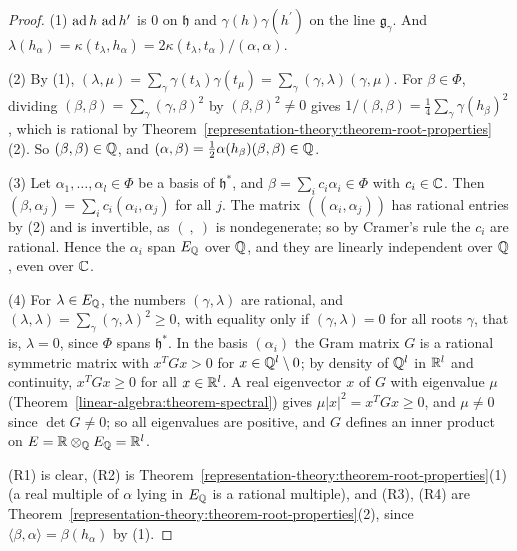 \begin{proof}
(1) $\operatorname{ad} h\,\operatorname{ad} h^{\prime}$ is $0$ on $\mathfrak{h}$ and $\gamma(h)\gamma(h^{\prime})$ on the line $\mathfrak{g}_\gamma$. And
$\lambda(h_\alpha) = \kappa(t_\lambda, h_\alpha) = 2\kappa(t_\lambda, t_\alpha)/(\alpha, \alpha)$.

(2) By (1), $(\lambda, \mu) = \sum_\gamma\gamma(t_\lambda)\gamma(t_\mu) = \sum_\gamma(\gamma, \lambda)(\gamma, \mu)$. For $\beta \in \Phi$, dividing
$(\beta, \beta) = \sum_\gamma(\gamma, \beta)^2$ by $(\beta, \beta)^2 \neq 0$ gives $1/(\beta, \beta) = \frac14\sum_\gamma\gamma(h_\beta)^2$, which is rational by
Theorem~\ref{representation-theory:theorem-root-properties}(2). So $(\beta, \beta) \in \mathbb{Q}$, and $(\alpha, \beta) = \frac12\alpha(h_\beta)(\beta, \beta) \in \mathbb{Q}$.

(3) Let $\alpha_1, \ldots, \alpha_l \in \Phi$ be a basis of $\mathfrak{h}^*$, and $\beta = \sum_ic_i\alpha_i \in \Phi$ with $c_i \in \mathbb{C}$. Then
$(\beta, \alpha_j) = \sum_ic_i(\alpha_i, \alpha_j)$ for all $j$. The matrix $((\alpha_i, \alpha_j))$ has rational entries by (2) and is invertible, as $(\ ,\ )$ is nondegenerate;
so by Cramer's rule the $c_i$ are rational. Hence the $\alpha_i$ span $E_{\mathbb{Q}}$ over $\mathbb{Q}$, and they are linearly independent over $\mathbb{Q}$, even over $\mathbb{C}$.

(4) For $\lambda \in E_{\mathbb{Q}}$, the numbers $(\gamma, \lambda)$ are rational, and $(\lambda, \lambda) = \sum_\gamma(\gamma, \lambda)^2 \geq 0$, with equality only if
$(\gamma, \lambda) = 0$ for all roots $\gamma$, that is, $\lambda = 0$, since $\Phi$ spans $\mathfrak{h}^*$. In the basis $(\alpha_i)$ the Gram matrix $G$ is a rational symmetric matrix
with $x^TGx > 0$ for $x \in \mathbb{Q}^l \setminus 0$; by density of $\mathbb{Q}^l$ in $\mathbb{R}^l$ and continuity, $x^TGx \geq 0$ for all $x \in \mathbb{R}^l$. A real eigenvector $x$ of $G$ with eigenvalue $\mu$
(Theorem~\ref{linear-algebra:theorem-spectral}) gives $\mu|x|^2 = x^TGx \geq 0$, and $\mu \neq 0$ since $\det G \neq 0$; so all eigenvalues are positive, and $G$ defines an inner product on
$E = \mathbb{R} \otimes_{\mathbb{Q}} E_{\mathbb{Q}} = \mathbb{R}^l$.

(R1) is clear, (R2) is Theorem~\ref{representation-theory:theorem-root-properties}(1) (a real multiple of $\alpha$ lying in $E_{\mathbb{Q}}$ is a rational multiple), and (R3), (R4) are
Theorem~\ref{representation-theory:theorem-root-properties}(2), since $\langle\beta, \alpha\rangle = \beta(h_\alpha)$ by (1).
\end{proof}

